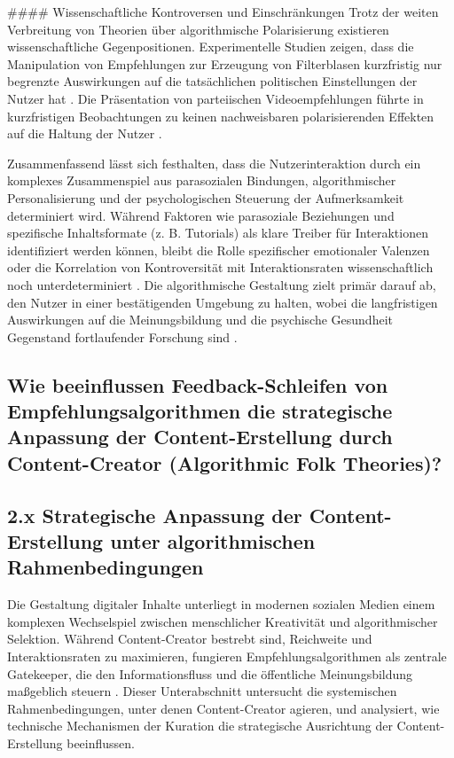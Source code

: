 \documentclass[11pt,a4paper]{article}
\begin{document}
\#\#\#\# Wissenschaftliche Kontroversen und Einschränkungen Trotz der weiten Verbreitung von Theorien über algorithmische Polarisierung existieren wissenschaftliche Gegenpositionen. Experimentelle Studien zeigen, dass die Manipulation von Empfehlungen zur Erzeugung von Filterblasen kurzfristig nur begrenzte Auswirkungen auf die tatsächlichen politischen Einstellungen der Nutzer hat \autocite{grey_grey_54e34d5df6ea4df2b6dbbe83e697dac1}. Die Präsentation von parteiischen Videoempfehlungen führte in kurzfristigen Beobachtungen zu keinen nachweisbaren polarisierenden Effekten auf die Haltung der Nutzer \autocite{grey_grey_54e34d5df6ea4df2b6dbbe83e697dac1}.

Zusammenfassend lässt sich festhalten, dass die Nutzerinteraktion durch ein komplexes Zusammenspiel aus parasozialen Bindungen, algorithmischer Personalisierung und der psychologischen Steuerung der Aufmerksamkeit determiniert wird. Während Faktoren wie parasoziale Beziehungen und spezifische Inhaltsformate (z. B. Tutorials) als klare Treiber für Interaktionen identifiziert werden können, bleibt die Rolle spezifischer emotionaler Valenzen oder die Korrelation von Kontroversität mit Interaktionsraten wissenschaftlich noch unterdeterminiert \autocite{grey_grey_5d5c282590c448fc8776b04f78a08de5,europepmc_41880228,grey_grey_54e34d5df6ea4df2b6dbbe83e697dac1}. Die algorithmische Gestaltung zielt primär darauf ab, den Nutzer in einer bestätigenden Umgebung zu halten, wobei die langfristigen Auswirkungen auf die Meinungsbildung und die psychische Gesundheit Gegenstand fortlaufender Forschung sind \autocite{grey_grey_bbc8a51d8734471c850e8c2939fe8d32,grey_grey_54e34d5df6ea4df2b6dbbe83e697dac1}.

\subsection{Wie beeinflussen Feedback-Schleifen von Empfehlungsalgorithmen die strategische Anpassung der Content-Erstellung durch Content-Creator (Algorithmic Folk Theories)?}

\subsection{2.x Strategische Anpassung der Content-Erstellung unter algorithmischen Rahmenbedingungen}

Die Gestaltung digitaler Inhalte unterliegt in modernen sozialen Medien einem komplexen Wechselspiel zwischen menschlicher Kreativität und algorithmischer Selektion. Während Content-Creator bestrebt sind, Reichweite und Interaktionsraten zu maximieren, fungieren Empfehlungsalgorithmen als zentrale Gatekeeper, die den Informationsfluss und die öffentliche Meinungsbildung maßgeblich steuern \autocite{crossref_10_31219_osf_io_y4kwm}. Dieser Unterabschnitt untersucht die systemischen Rahmenbedingungen, unter denen Content-Creator agieren, und analysiert, wie technische Mechanismen der Kuration die strategische Ausrichtung der Content-Erstellung beeinflussen.
\end{document}
